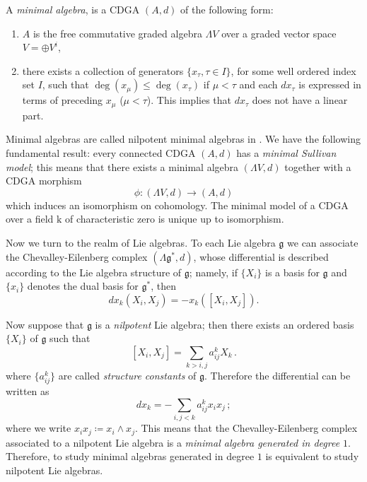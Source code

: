 \documentclass[10pt,reqno]{amsart}
\newcommand{\kk}{\mathrm{k}}
\newcommand{\frg}{\mathfrak{g}}
\theoremstyle{definition}
\begin{document}
A {\em minimal algebra}, is a CDGA $(A,d)$ of the following form:
\begin{enumerate}
 \item $A$ is the free commutative graded
 algebra $\Lambda V$ over a graded vector space $V=\oplus V^i$, %
 \item there exists a collection of generators $\{ x_\tau,
 \tau\in I\}$, for some well ordered index set $I$, such that
 $\deg(x_\mu)\leq \deg(x_\tau)$ if $\mu < \tau$ and each $d
 x_\tau$ is expressed in terms of preceding $x_\mu$ ($\mu<\tau$).
 This implies that $dx_\tau$ does not have a linear part.
\end{enumerate}

Minimal algebras are called nilpotent minimal algebras in \cite{Sullivan}. We have the following fundamental result: every connected CDGA $(A,d)$ has a \emph{minimal Sullivan model}; this means that there
exists a minimal algebra $(\Lambda V,d)$ together with a CDGA morphism
\[
\phi\colon(\Lambda V,d)\to(A,d)
\]
which induces an isomorphism on cohomology. The minimal model of a CDGA over a field $\kk$ of characteristic zero is unique up to isomorphism.


\medskip

Now we turn to the realm of Lie algebras.
To each Lie algebra $\frg$ we can associate the Chevalley-Eilenberg complex $(\Lambda\frg^*,d)$, whose differential is described according to the Lie algebra structure of $\frg$; namely, if $\{X_i\}$ is a basis for $\frg$ and $\{x_i\}$ denotes the dual basis for $\frg^*$, then
\begin{equation}\label{eq:224}
 d x_k(X_i,X_j)=-x_k([X_i,X_j]).
\end{equation}

Now suppose that $\frg$ is a \textit{nilpotent} Lie algebra; then there exists an ordered basis $\{X_i\}$ of $\frg$ such that
 \begin{equation}\label{eq:star}
 [X_i,X_j]=\sum_{k>i,j}a_{ij}^kX_k\, .
 \end{equation}
where $\{a_{ij}^k\}$ are called \emph{structure constants} of $\frg$. Therefore the differential can be written as
\begin{equation}\label{eq:224-2}
 dx_k= - \sum_{i,j<k}a_{ij}^k x_ix_j \,;
\end{equation}
where we write $x_ix_j\coloneqq x_i\wedge x_j$. This means that the Chevalley-Eilenberg complex associated to a nilpotent Lie algebra is a
\emph{minimal algebra generated in degree $1$}. Therefore, to study minimal algebras
generated in degree $1$ is equivalent to study nilpotent Lie algebras.
\end{document}
